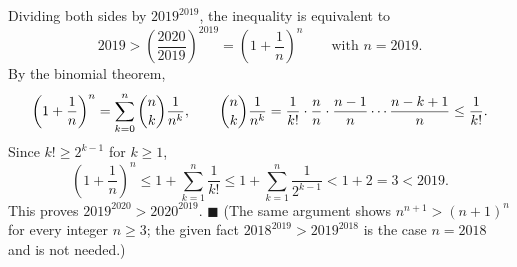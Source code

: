 Dividing both sides by $2019^{2019}$, the inequality is equivalent to
\[
2019>\left(\dfrac{2020}{2019}\right)^{2019}=\left(1+\dfrac{1}{n}\right)^n\qquad\text{with } n=2019 .
\]
By the binomial theorem,
\[
\left(1+\dfrac{1}{n}\right)^n=\sum_{k=0}^{n}\dbinom nk\dfrac{1}{n^k},\qquad
\dbinom nk\dfrac{1}{n^k}=\dfrac{1}{k!}\cdot\dfrac{n}{n}\cdot\dfrac{n-1}{n}\cdots\dfrac{n-k+1}{n}\le\dfrac{1}{k!}.
\]
Since $k!\ge2^{k-1}$ for $k\ge1$,
\[
\left(1+\dfrac{1}{n}\right)^n\le1+\sum_{k=1}^{n}\dfrac{1}{k!}\le1+\sum_{k=1}^{n}\dfrac{1}{2^{k-1}}<1+2=3<2019 .
\]
This proves $2019^{2020}>2020^{2019}$. $\blacksquare$ (The same argument shows $n^{n+1}>(n+1)^n$ for every integer $n\ge3$; the given fact $2018^{2019}>2019^{2018}$ is the case $n=2018$ and is not needed.)
